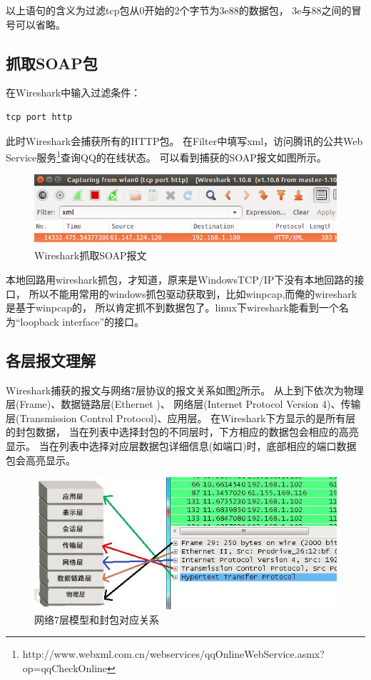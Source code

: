 \documentclass{book}
\begin{document}
以上语句的含义为过滤tcp包从0开始的2个字节为3e88的数据包，
3e与88之间的冒号可以省略。

\subsection{抓取SOAP包}

在Wireshark中输入过滤条件：

\begin{lstlisting}[language=Bash]
tcp port http
\end{lstlisting}

此时Wireshark会捕获所有的HTTP包。
在Filter中填写xml，访问腾讯的公共Web Service服务\footnote{http://www.webxml.com.cn/webservices/qqOnlineWebService.asmx?op=qqCheckOnline}查询QQ的在线状态。
可以看到捕获的SOAP报文如图所示。

\begin{figure}[htbp]
	\centering
	\includegraphics[scale=0.6]{WiresharkCaptureSoap.png}
	\caption{Wireshark抓取SOAP报文}
	\label{fig:WiresharkCaptureSoap}
\end{figure}

本地回路用wireshark抓包，才知道，原来是WindowsTCP/IP下没有本地回路的接口，
所以不能用常用的windows抓包驱动获取到，比如winpcap,而俺的wireshark是基于winpcap的，
所以肯定抓不到数据包了。linux下wireshark能看到一个名为“loopback interface”的接口。

\subsection{各层报文理解}


Wireshark捕获的报文与网络7层协议的报文关系如图\ref{fig:SevenModelInWireshark}所示。
从上到下依次为物理层(Frame)、数据链路层(Ethernet \uppercase\expandafter{})、
网络层(Internet Protocol Version 4)、传输层(Transmission Control Protocol)、应用层。
在Wireshark下方显示的是所有层的封包数据，
当在列表中选择封包的不同层时，下方相应的数据包会相应的高亮显示。
当在列表中选择对应层数据包详细信息(如端口)时，底部相应的端口数据包会高亮显示。

\begin{figure}[htbp]
	\centering
	\includegraphics[scale=0.6]{SevenModelInWireshark.jpg}
	\caption{网络7层模型和封包对应关系}
	\label{fig:SevenModelInWireshark}
\end{figure}
\end{document}
